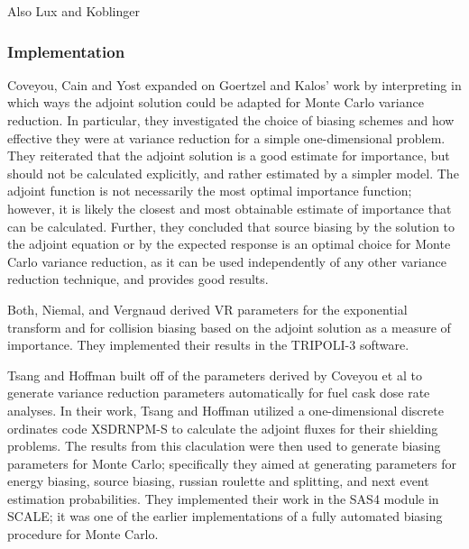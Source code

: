 Also Lux and Koblinger \cite{lux_monte_carlo}

\subsubsection{Implementation}

Coveyou, Cain and Yost \cite{coveyou_adjoint_1967} expanded on Goertzel and
Kalos' work by interpreting in which ways the adjoint solution could be adapted
for Monte Carlo variance reduction. In particular, they investigated the choice
of biasing schemes and how effective they were at variance reduction for a
simple one-dimensional problem. They reiterated that the adjoint solution is a
good estimate for importance, but should not be calculated explicitly, and
rather estimated by a simpler model. The adjoint function is not necessarily the
most optimal importance function; however, it is likely the closest and most
obtainable estimate of importance that can be calculated. Further, they
concluded that source biasing by the solution to the adjoint equation or by the
expected response is an optimal choice for Monte Carlo variance reduction, as it
can be used independently of any other variance reduction technique, and
provides good results.

Both, Niemal, and Vergnaud \cite{both_automated_1990} derived VR parameters for
the exponential transform and for collision biasing based on the adjoint
solution as a measure of importance. They implemented their results in the
TRIPOLI-3 software.

Tsang and Hoffman \cite{tsang_monte_1988} built off of the parameters derived by
Coveyou et al \cite{coveyou_adjoint_1967} to generate variance reduction
parameters automatically for fuel cask dose rate analyses. In their work, Tsang
and Hoffman utilized a one-dimensional discrete ordinates code XSDRNPM-S to
calculate the adjoint fluxes for their shielding problems. The results from this
claculation were then used to generate biasing parameters for Monte Carlo;
specifically they aimed at generating parameters for energy biasing, source
biasing, russian roulette and splitting, and next event estimation
probabilities. They implemented their work in the SAS4 module in SCALE; it was
one of the earlier implementations of a fully automated biasing procedure for
Monte Carlo.


